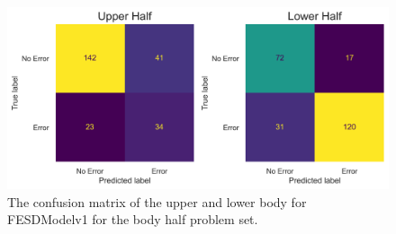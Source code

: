 \begin{figure}[!htbp]
  \centering
  \includegraphics[width=.8\linewidth]{figures/Results/v1/confusion/body_halves_half.png}
  \caption[Confusion matrix of FESDModelv1 for each Body Half]{The confusion matrix of the upper and lower body for FESDModelv1 for the body half problem set.}
  \label{fig:conf_v1_hbs}
\end{figure}

\FloatBarrier
